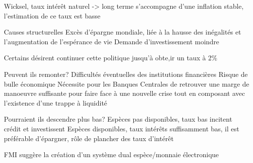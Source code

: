 \documentclass[main.tex]{subfiles}
\begin{document}
Wicksel, taux intérêt naturel -> long terme s'accompagne d'une inflation stable, l'estimation de ce taux est basse

Causes structurelles
Excès d'épargne mondiale, liée à la hausse des inégalités et l'augmentation de l'espérance de vie
Demande d'investissement moindre

Certains désirent continuer cette politique jusqu'à obte,ir un taux à 2\%


Peuvent ils remonter?
Difficultés éventuelles des institutions financières
Risque de bulle économique
Nécessite pour les Banques Centrales de retrouver une marge de manoeuvre suffisante pour faire face à une nouvelle crise tout en composant avec l'existence d'une trappe à liquidité


Pourraient ils descendre plus bas?
Espèces pas disponibles, taux bas incitent crédit et investissent
Espèces disponibles, taux intérêts suffisamment bas, il est préférable d'épargner, rôle de plancher des taux d'intérêt

FMI suggère la création d'un système dual espèce/monnaie électronique 
\end{document}

